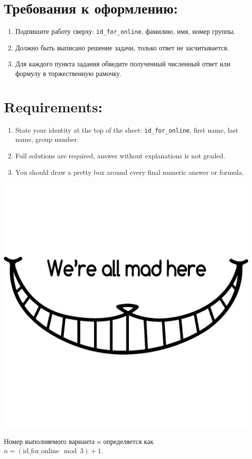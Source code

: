 \documentclass[12pt]{article}
\newcommand \id {\mathrm{id}\_\mathrm{for}\_\mathrm{online}}
\begin{document}
\section*{Требования к оформлению:}

\begin{enumerate}
\item Подпишите работу сверху: \verb|id_for_online|, фамилию, имя, номер группы.
\item Должно быть выписано решение задачи, только ответ не засчитывается.
\item Для каждого пункта задания обведите полученный численный ответ или формулу в торжественную рамочку.
\end{enumerate}

\section*{Requirements:}

\begin{enumerate}
\item State your identity at the top of the sheet: \verb|id_for_online|, first name, last name, group number.
\item Full solutions are required, answer without explanations is not graded. 
\item You should draw a pretty box around every final numeric answer or formula.
\end{enumerate}


\begin{center}
  \begin{minipage}{5cm}
    \includegraphics[height=30ex]{cheshire_cat.png}
  \end{minipage}
\end{center}
  


\newpage

Номер выполняемого варианта $n$ определяется как $n=(\id \mod 3)+1$. 
\end{document}
